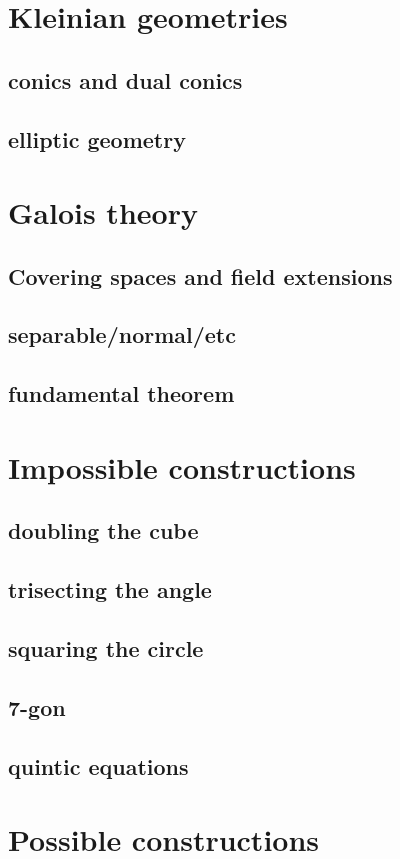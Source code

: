 \chapter{Kleinian geometries}
\section{conics and dual conics}
\section{elliptic geometry}
\chapter{Galois theory}
\section{Covering spaces and field extensions}
\section{separable/normal/etc}
\section{fundamental theorem}
\chapter{Impossible constructions}
\section{doubling the cube}
\section{trisecting the angle}
\section{squaring the circle}
\section{7-gon}
\section{quintic equations}
\chapter{Possible constructions}
